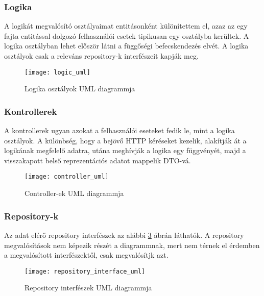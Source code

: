 \clearpage

\subsubsection{Logika}
A logikát megvalósító osztályaimat entitásonként különítettem el, azaz az egy fajta entitással dolgozó felhasználói esetek tipikusan egy osztályba kerültek. A logika osztályban lehet először látni a függőségi befecskendezés elvét. A logika osztályok csak a releváns repository-k interfészeit kapják meg.

\begin{figure}[H]
	\centering
	\texttt{[image: logic\_uml]}
	\caption{Logika osztályok UML diagrammja}
	\label{fig:logic}
\end{figure}

\clearpage

\subsubsection{Kontrollerek}

A kontrollerek ugyan azokat a felhasználói eseteket fedik le, mint a logika osztályok. A különbség, hogy a bejövő HTTP kéréseket kezelik, alakítják át a logikának megfelelő adatra, utána meghívják a logika egy függvényét, majd a visszakapott belső reprezentációs adatot mappelik DTO-vá.

\begin{figure}[H]
	\centering
	\texttt{[image: controller\_uml]}
	\caption{Controller-ek UML diagrammja}
	\label{fig:controllers}
\end{figure}

\clearpage

\subsubsection{Repository-k}

Az adat elérő repository interfészek az alábbi \ref{fig:repoInterfaces} ábrán láthatók.
A repository megvalósítások nem képezik részét a diagrammnak, mert nem térnek el érdemben a megvalósított interfészektől, csak megvalósítjk azt.

\begin{figure}[H]
	\centering
	\texttt{[image: repository\_interface\_uml]}
	\caption{Repository interfészek UML diagrammja}
	\label{fig:repoInterfaces}
\end{figure}


